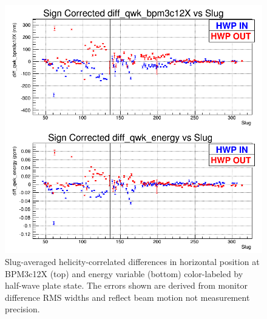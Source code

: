 \begin{figure}
\centering
\includegraphics[width=5.9in]{./Pictures/EDifferences_by_Slug.png}
\caption{\label{fig:Ediff_by_slug}Slug-averaged helicity-correlated differences in horizontal position at BPM3c12X (top) and \Qs energy variable (bottom) color-labeled by half-wave plate state. The errors shown are derived from monitor difference RMS widths and reflect beam motion not measurement precision.}
\end{figure}

